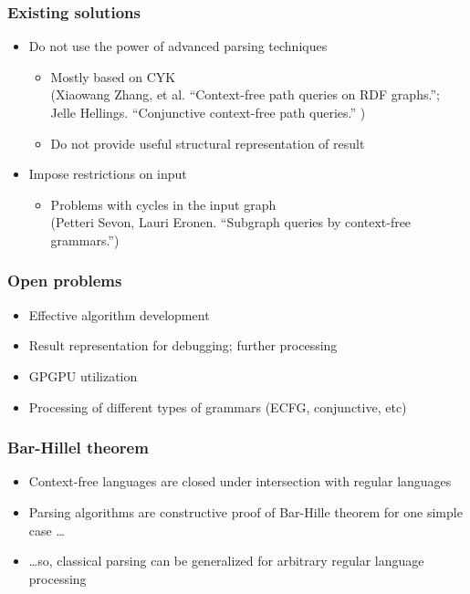 \documentclass{beamer}
\begin{document}
\begin{frame}
  \transwipe[direction=90]
  \frametitle{Existing solutions}
  \begin{itemize}
    \item Do not use the power of advanced parsing techniques
    \begin{itemize}
       \item Mostly based on CYK \\ (Xiaowang Zhang, et al. ``Context-free path queries on RDF graphs.''; \\ Jelle Hellings. ``Conjunctive context-free path queries.'' )
       \item Do not provide useful structural representation of result
     \end{itemize}
    \item Impose restrictions on input
    \begin{itemize}
       \item Problems with cycles in the input graph \\ (Petteri Sevon, Lauri Eronen. ``Subgraph queries by context-free grammars.'')
     \end{itemize}
  \end{itemize}
\end{frame}

\begin{frame}
  \transwipe[direction=90]
  \frametitle{Open problems}
  \begin{itemize}
    \item Effective algorithm development
    \item Result representation for debugging; further processing 
    \item GPGPU utilization
    \item Processing of different types of grammars (ECFG, conjunctive, etc)
  \end{itemize}
\end{frame}

\begin{frame}
  \transwipe[direction=90]
  \frametitle{Bar-Hillel theorem}
  \begin{itemize}
    \item Context-free languages are closed under intersection with regular languages
    \item Parsing algorithms are constructive proof of Bar-Hille theorem for one simple case \dots
    \item \dots so, classical parsing can be generalized for arbitrary regular language processing
  \end{itemize}
\end{frame}
\end{document}
